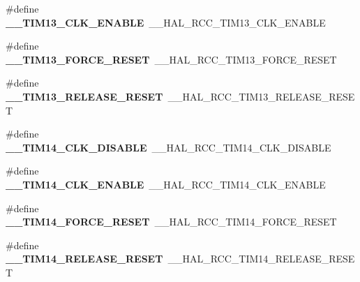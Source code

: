 \begin{DoxyCompactItemize}
\#define {\bfseries \+\_\+\+\_\+\+T\+I\+M13\+\_\+\+C\+L\+K\+\_\+\+E\+N\+A\+B\+LE}~\+\_\+\+\_\+\+H\+A\+L\+\_\+\+R\+C\+C\+\_\+\+T\+I\+M13\+\_\+\+C\+L\+K\+\_\+\+E\+N\+A\+B\+LE
\item 
\mbox{\label{group___h_a_l___r_c_c___aliased_ga93a1ee53bfd837e622370714d258835e}} 
\#define {\bfseries \+\_\+\+\_\+\+T\+I\+M13\+\_\+\+F\+O\+R\+C\+E\+\_\+\+R\+E\+S\+ET}~\+\_\+\+\_\+\+H\+A\+L\+\_\+\+R\+C\+C\+\_\+\+T\+I\+M13\+\_\+\+F\+O\+R\+C\+E\+\_\+\+R\+E\+S\+ET
\item 
\mbox{\label{group___h_a_l___r_c_c___aliased_ga6f650b47d31086ec19b1c1a146124930}} 
\#define {\bfseries \+\_\+\+\_\+\+T\+I\+M13\+\_\+\+R\+E\+L\+E\+A\+S\+E\+\_\+\+R\+E\+S\+ET}~\+\_\+\+\_\+\+H\+A\+L\+\_\+\+R\+C\+C\+\_\+\+T\+I\+M13\+\_\+\+R\+E\+L\+E\+A\+S\+E\+\_\+\+R\+E\+S\+ET
\item 
\mbox{\label{group___h_a_l___r_c_c___aliased_gae9d1d7754509af407addaa6e96e35e95}} 
\#define {\bfseries \+\_\+\+\_\+\+T\+I\+M14\+\_\+\+C\+L\+K\+\_\+\+D\+I\+S\+A\+B\+LE}~\+\_\+\+\_\+\+H\+A\+L\+\_\+\+R\+C\+C\+\_\+\+T\+I\+M14\+\_\+\+C\+L\+K\+\_\+\+D\+I\+S\+A\+B\+LE
\item 
\mbox{\label{group___h_a_l___r_c_c___aliased_ga17ea8a6c97269b92eb4c267565e1504c}} 
\#define {\bfseries \+\_\+\+\_\+\+T\+I\+M14\+\_\+\+C\+L\+K\+\_\+\+E\+N\+A\+B\+LE}~\+\_\+\+\_\+\+H\+A\+L\+\_\+\+R\+C\+C\+\_\+\+T\+I\+M14\+\_\+\+C\+L\+K\+\_\+\+E\+N\+A\+B\+LE
\item 
\mbox{\label{group___h_a_l___r_c_c___aliased_gae83b078b087527043d44dcb3c00b2396}} 
\#define {\bfseries \+\_\+\+\_\+\+T\+I\+M14\+\_\+\+F\+O\+R\+C\+E\+\_\+\+R\+E\+S\+ET}~\+\_\+\+\_\+\+H\+A\+L\+\_\+\+R\+C\+C\+\_\+\+T\+I\+M14\+\_\+\+F\+O\+R\+C\+E\+\_\+\+R\+E\+S\+ET
\item 
\mbox{\label{group___h_a_l___r_c_c___aliased_gadb150e0f413bbb69889b787e2633254b}} 
\#define {\bfseries \+\_\+\+\_\+\+T\+I\+M14\+\_\+\+R\+E\+L\+E\+A\+S\+E\+\_\+\+R\+E\+S\+ET}~\+\_\+\+\_\+\+H\+A\+L\+\_\+\+R\+C\+C\+\_\+\+T\+I\+M14\+\_\+\+R\+E\+L\+E\+A\+S\+E\+\_\+\+R\+E\+S\+ET
\item 
\mbox{\label{group___h_a_l___r_c_c___aliased_gaf520deb7e38c475a833720a8c449bfcd}} 

\end{DoxyCompactItemize}
